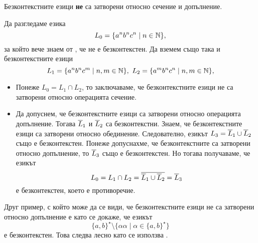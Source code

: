 \begin{framed}
  \begin{proposition}
    Безконтекстните езици {\bf не} са затворени относно сечение и допълнение.
  \end{proposition}
\end{framed}
\begin{hint}
  Да разгледаме езика
  \[L_0 = \{a^nb^nc^n\mid n\in\mathbb{N}\},\] за който вече знаем от , че не е безконтекстен.
  Да вземем също така и безконтекстните езици 
  \[L_1 = \{a^nb^nc^m\mid n,m\in\mathbb{N}\},\ L_2 = \{a^mb^nc^n\mid n,m\in\mathbb{N}\},\]
  \begin{itemize}
  \item 
    Понеже $L_0 = L_1\cap L_2$, то заключаваме, че безконтекстните езици не са затворени 
    относно операцията сечение.
  \item
    Да допуснем, че безконтекстните езици са затворени относно операцията допълнение.
    Тогава  $\overline{L}_1$ и $\overline{L}_2$ са безконтекстни.
    Знаем, че безконтекстните езици са затворени относно обединение. 
    Следователно, езикът $L_3 = \overline{L}_1 \cup \overline{L}_2$ също е безконтекстен.
    Понеже допуснахме, че безконтекстните са затворени относно допълнение, то $\overline{L}_3$ също е безконтекстен.
    Но тогава получаваме, че езикът
    \[L_0 = L_1 \cap L_2 = \overline{\overline{L}_1 \cup \overline{L}_2} = \overline{L}_3\]
    е безконтекстен, което е противоречие.
  \end{itemize}

  Друг пример, с който може да се види, че безконтекстните езици не са затворени относно допълнение е 
  като се докаже, че езикът
  \[\{a,b\}^\star \setminus \{\alpha\alpha\mid \alpha\in \{a,b\}^\star\}\]
  е безконтекстен.
  Това следва лесно като се използва .
\end{hint}




